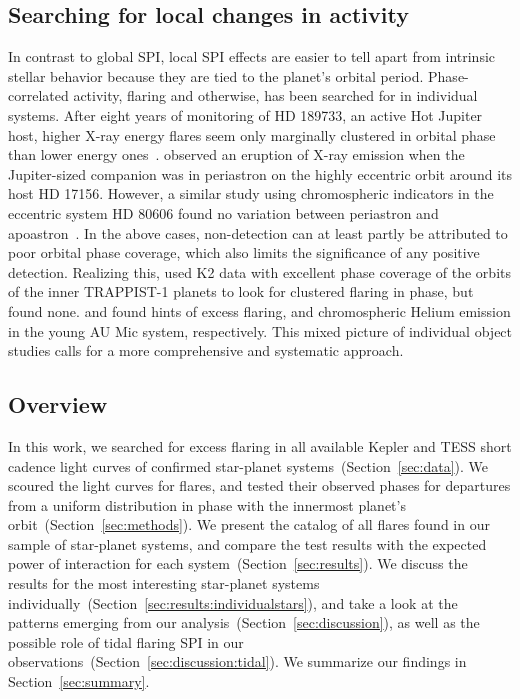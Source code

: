 \documentclass[twocolumn]{aastex631}
\begin{document}
\subsection{Searching for local changes in activity}
\label{sec:intro:local}
In contrast to global SPI, local SPI effects are easier to tell apart from intrinsic stellar behavior because they are tied to the planet's orbital period. 
Phase-correlated activity, flaring and otherwise, has been searched for in individual systems. After eight years of monitoring of HD 189733, an active Hot Jupiter host, higher X-ray energy flares seem only marginally clustered in orbital phase than lower energy ones~\citep{pillitteri2022xray}. \citet{maggio2015coordinated} observed an eruption of X-ray emission when the Jupiter-sized companion was in periastron on the highly eccentric orbit around its host HD 17156. However, a similar study using chromospheric indicators in the eccentric system HD 80606 found no variation between periastron and apoastron~\citep{figueira2016activity}. In the above cases, non-detection can at least partly be attributed to poor orbital phase coverage, which also limits the significance of any positive detection. Realizing this, \citet{fischer2019timevariable} used K2 data with excellent phase coverage of the orbits of the inner \mbox{TRAPPIST-1} planets to look for clustered flaring in phase, but found none. \citet{ilin2022searching} and \citet{klein2022one} found hints of excess flaring, and chromospheric Helium emission in the young AU Mic system, respectively. This mixed picture of individual object studies calls for a more comprehensive and systematic approach.

\subsection{Overview}
In this work, we searched for excess flaring in all available Kepler and TESS short cadence light curves of confirmed star-planet systems~(Section~\ref{sec:data}). We scoured the light curves for flares, and tested their observed phases for departures from a uniform distribution in phase with the innermost planet's orbit~(Section~\ref{sec:methods}). We present the catalog of all flares found in our sample of star-planet systems, and compare the test results with the expected power of interaction for each system~(Section~\ref{sec:results}). We discuss the results for the most interesting star-planet systems individually~(Section~\ref{sec:results:individualstars}), and take a look at the patterns emerging from our analysis~(Section~\ref{sec:discussion}), as well as the possible role of tidal flaring SPI in our observations~(Section~\ref{sec:discussion:tidal}).  We summarize our findings in Section~\ref{sec:summary}. 
\end{document}
